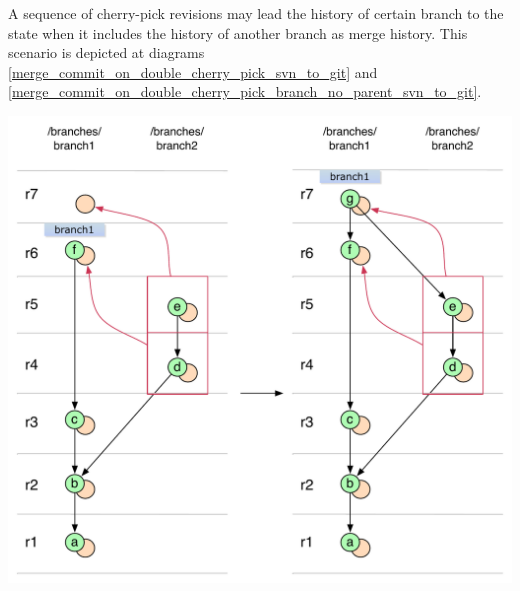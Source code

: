 A sequence of cherry-pick revisions may lead the history of certain branch to the state when it includes the history of another branch as merge history. This scenario is depicted at diagrams \ref{merge_commit_on_double_cherry_pick_svn_to_git} and \ref{merge_commit_on_double_cherry_pick_branch_no_parent_svn_to_git}.

\begin{center}
\includegraphics[width=\textwidth]{img/diagrams/merge_commit_on_double_cherry_pick_svn_to_git.pdf}%
\label{merge_commit_on_double_cherry_pick_svn_to_git}%
\end{center}

